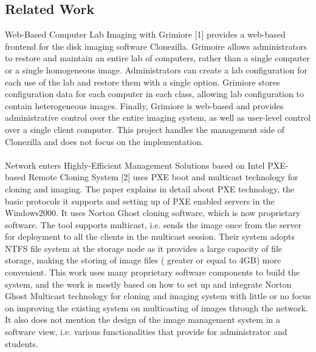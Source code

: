 \documentclass[a4paper,12pt]{article}
\begin{document}
\subsection{ Related Work}

Web-Based Computer Lab Imaging with Grimiore [1] provides a web-based frontend for the disk imaging software Clonezilla. Grimoire allows administrators to restore and maintain an entire lab of computers, rather than a single computer or a single homogeneous image. Administrators can create a lab configuration for each use of the lab and restore them with a single option. Grimiore stores configuration data for each computer in each class, allowing lab configuration to contain heterogeneous images. Finally, Grimiore is web-based and provides administrative control over the entire imaging system, as well as user-level control over a single client computer.
This project handles the management side of Clonezilla and does not focus on the implementation.
\paragraph{}
Network enters Highly-Efficient Management Solutions based on Intel PXE-
based Remote Cloning System [2] uses PXE boot and multicast technology for cloning and imaging. The paper explains in detail about PXE technology, the basic protocols it supports and setting up of PXE enabled servers in the Windows2000.
It uses Norton Ghost cloning software, which is now proprietary software. The tool supports multicast, i.e. sends the image once from the server for deployment to all the clients in the multicast session. Their system adopts NTFS file system at the storage node as it provides a large capacity of file storage, making the storing of image files ( greater or equal to 4GB) more convenient. This work uses many proprietary software components to build the system, and the work is mostly based on how to set up and integrate Norton Ghost Multicast technology for cloning and imaging system with little or no focus on improving the existing system on multicasting of images through the network. It also does not mention the design of the image management system in a software view, i.e. various functionalities that provide for administrator and students.
\end{document}
